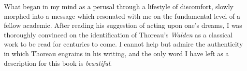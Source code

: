 \documentclass[12pt]{article}
\begin{document}
What began in my mind as a perusal through a lifestyle of discomfort, slowly morphed into a message which resonated with me on the fundamental level of a fellow academic. After reading his suggestion of acting upon one's dreams, I was thoroughly convinced on the identification of Thoreau's \emph{Walden} as a classical work to be read for centuries to come. I cannot help but admire the authenticity in which Thoreau engrains in his writing, and the only word I have left as a description for this book is \emph{beautiful}.
\end{document}
